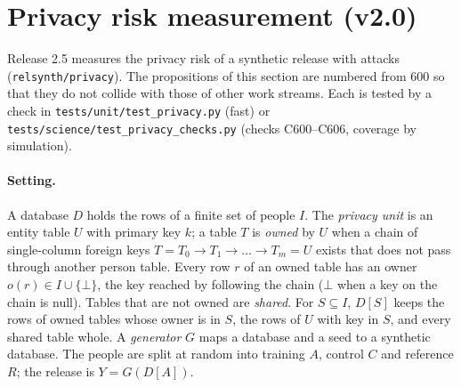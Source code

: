 \section{Privacy risk measurement (v2.0)}\label{sec:v25}
\setcounter{savedprop}{\value{proposition}}
Release 2.5 measures the privacy risk of a synthetic release with attacks (\texttt{relsynth/privacy}). The propositions of this section are numbered from 600 so that they do not collide with those of other work streams. Each is tested by a check in \texttt{tests/unit/test\_privacy.py} (fast) or \texttt{tests/science/test\_privacy\_checks.py} (checks C600--C606, coverage by simulation).

\paragraph{Setting.} A database $D$ holds the rows of a finite set of people $I$. The \emph{privacy unit} is an entity table $U$ with primary key $k$; a table $T$ is \emph{owned} by $U$ when a chain of single-column foreign keys $T=T_0\to T_1\to\dots\to T_m=U$ exists that does not pass through another person table. Every row $r$ of an owned table has an owner $o(r)\in I\cup\{\bot\}$, the key reached by following the chain ($\bot$ when a key on the chain is null). Tables that are not owned are \emph{shared}. For $S\subseteq I$, $D[S]$ keeps the rows of owned tables whose owner is in $S$, the rows of $U$ with key in $S$, and every shared table whole. A \emph{generator} $G$ maps a database and a seed to a synthetic database. The people are split at random into training $A$, control $C$ and reference $R$; the release is $Y=G(D[A])$.

